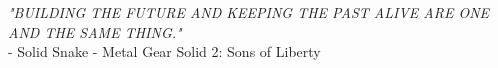 \clearpage
{}%

\begin{Center}
	\centering \MakeUppercase {\textit{"Building the future and keeping the past alive are one and the same thing."}}\\
	- Solid Snake - Metal Gear Solid 2: Sons of Liberty
\end{Center}
 
\clearpage